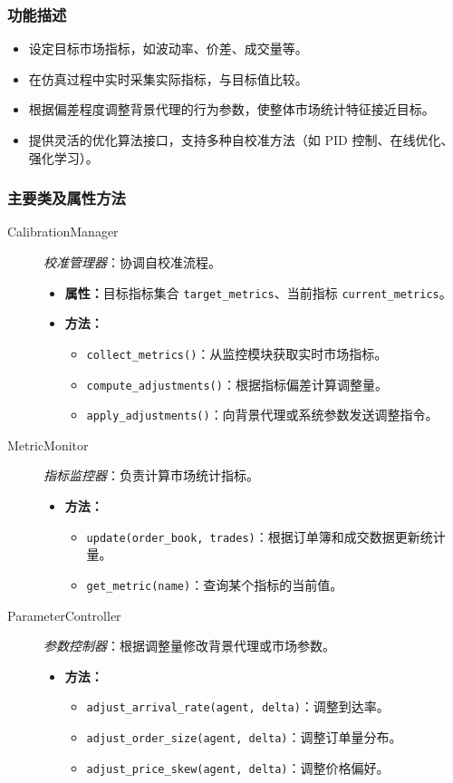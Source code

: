 \subsubsection{功能描述}
\begin{itemize}
  \item 设定目标市场指标，如波动率、价差、成交量等。
  \item 在仿真过程中实时采集实际指标，与目标值比较。
  \item 根据偏差程度调整背景代理的行为参数，使整体市场统计特征接近目标。
  \item 提供灵活的优化算法接口，支持多种自校准方法（如 PID 控制、在线优化、强化学习）。
\end{itemize}

\subsubsection{主要类及属性方法}
\begin{description}
  \item[CalibrationManager] \emph{校准管理器}：协调自校准流程。
  \begin{itemize}
    \item \textbf{属性：}目标指标集合 \verb|target_metrics|、当前指标 \verb|current_metrics|。
    \item \textbf{方法：}
      \begin{itemize}
        \item \verb|collect_metrics()|：从监控模块获取实时市场指标。
        \item \verb|compute_adjustments()|：根据指标偏差计算调整量。
        \item \verb|apply_adjustments()|：向背景代理或系统参数发送调整指令。
      \end{itemize}
  \end{itemize}
  \item[MetricMonitor] \emph{指标监控器}：负责计算市场统计指标。
  \begin{itemize}
    \item \textbf{方法：}
      \begin{itemize}
        \item \verb|update(order_book, trades)|：根据订单簿和成交数据更新统计量。
        \item \verb|get_metric(name)|：查询某个指标的当前值。
      \end{itemize}
  \end{itemize}
  \item[ParameterController] \emph{参数控制器}：根据调整量修改背景代理或市场参数。
  \begin{itemize}
    \item \textbf{方法：}
      \begin{itemize}
        \item \verb|adjust_arrival_rate(agent, delta)|：调整到达率。
        \item \verb|adjust_order_size(agent, delta)|：调整订单量分布。
        \item \verb|adjust_price_skew(agent, delta)|：调整价格偏好。
      \end{itemize}
  \end{itemize}
\end{description}

